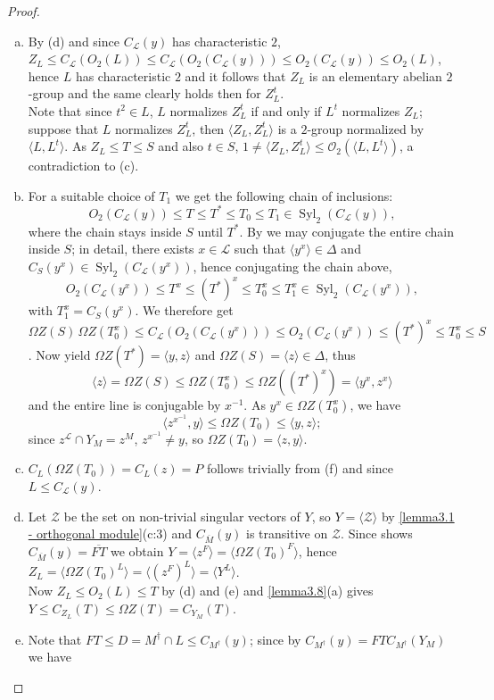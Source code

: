 \documentclass{amsart}
\numberwithin{equation}{section}
\theoremstyle{definition}
\theoremstyle{subresult}
\theoremstyle{caseresult}
\renewcommand{\L}{\mathcal{L}}
\newcommand{\Z}{\mathcal{Z}}
\newcommand{\coll}{\mathcal{O}}
\newcommand{\Syl}{\operatorname{Syl}}
\newcommand{\ov}{\overline}
\newcommand{\inv}{^{-1}}
\newcommand{\<}{\langle}
\renewcommand{\>}{\rangle}
\begin{document}
\begin{proof}
\begin{enumerate}[(a)]
		\item By (d) and since $C_\L(y)$ has characteristic $2$, $Z_L \le C_\L(O_2(L)) \le C_\L(O_2(C_\L(y))) \le O_2(C_\L(y)) \le O_2(L)$, hence $L$ has characteristic $2$ and it follows that $Z_L$ is an elementary abelian $2$-group and the same clearly holds then for $Z_L^t$.\\ Note that since $t^2 \in L$, $L$ normalizes $Z_L^t$ if and only if $L^t$ normalizes $Z_L$; suppose that $L$ normalizes $Z_L^t$, then $\<Z_L, Z_L^t \>$ is a $2$-group normalized by $\<L,L^t\>$. As $Z_L \le T \le S$ and also $t \in S$, $1 \ne \< Z_L, Z_L^t\> \le \coll_2(\<L,L^t\>)$, a contradiction to (c).
		\item For a suitable choice of $T_1$ we get the following chain of inclusions:
		\[
		O_2(C_\L(y)) \le T \le T^* \le T_0 \le T_1 \in \Syl_2(C_\L(y)),
		\]
		where the chain stays inside $S$ until $T^*$. By \cite[Lemma 2.9]{Chermak:2022:I} we may conjugate the entire chain inside $S$; in detail, there exists $x \in \L$ such that $\<y^{x}\> \in \Delta$ and $C_S(y^{x}) \in \Syl_2(C_\L(y^{x}))$, hence conjugating the chain above,
		\[
		O_2(C_\L(y^{x})) \le T^{x} \le (T^*)^{x} \le T_0^{x} \le T_1^{x} \in \Syl_2(C_\L(y^{x})),
		\]
		with $T_1^{x} = C_S(y^{x})$. We therefore get $\Omega Z (S) \, \Omega Z(T_0^x) \le C_\L(O_2(C_\L(y^{x}))) \le O_2(C_\L(y^{x})) \le (T^*)^x \le T_0^x \le S$. Now \cite[Lemma 3.4(f) and (g)]{Meier-Stell-Stroth:2012} yield $\Omega Z(T^*) = \< y, z \>$ and $\Omega Z (S) = \< z \> \in \Delta$, thus
		\[
		\<z\> = \Omega Z(S) \le \Omega Z(T_0^x) \le \Omega Z ((T^*)^x) = \< y^x, z^x \>
		\]          
		and the entire line is conjugable by $x\inv$. As $y^x \in \Omega Z(T_0^x)$, we have
		\[
		\< z^{x\inv}, y \> \le \Omega Z (T_0) \le \<y,z \>;
		\]
		since $z^\L \cap Y_M = z^M$, $z^{x\inv} \ne y$, so $\Omega Z(T_0) = \<z,y\>$.
		\item $C_L(\Omega Z(T_0)) = C_L(z) = P$ follows trivially from (f) and since $L \le C_\L(y)$.
		\item Let $\Z$ be the set on non-trivial singular vectors of $Y$, so $Y = \<\Z\>$ by \ref{lemma3.1 - orthogonal module}(c:3) and $C_{\ov{M}}(y)$ is transitive on $\Z$. Since \cite[Lemma 3.4(b)]{Meier-Stell-Stroth:2012} shows $C_{\ov{M}}(y) = \ov{FT}$ we obtain $Y=\< z^F \> = \< \Omega Z(T_0)^F \>$, hence $Z_L = \<\Omega Z(T_0)^L \> = \< (z^F)^L\> = \<Y^L\>$.\\
		Now $Z_L \le O_2(L) \le T$ by (d) and (e) and \ref{lemma3.8}(a) gives $Y \le C_{Z_L}(T) \le \Omega Z(T) = C_{Y_M}(T)$.
		\item Note that $FT \le D = M^\dagger \cap L \le C_{M^\dagger}(y)$; since by \cite[Lemma 3.4(k)]{Meier-Stell-Stroth:2012} $C_{M^\dagger}(y)=FTC_{M^\dagger}(Y_M)$ we have

\end{enumerate}
\end{proof}
\end{document}
